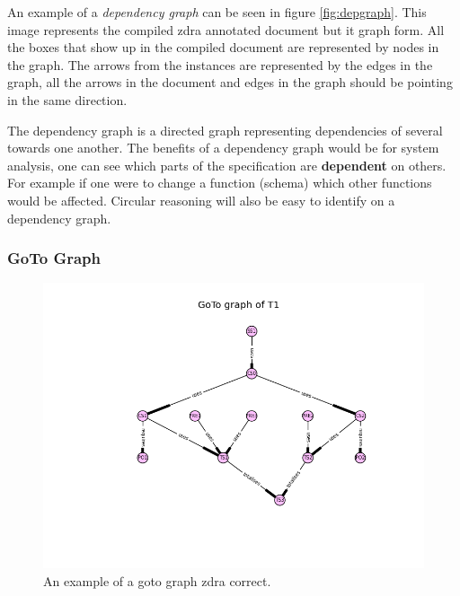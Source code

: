 An example of a \emph{dependency graph} can be seen in figure
\ref{fig:depgraph}. This image represents the compiled \gls{zdra} annotated
document but it graph form. All the boxes that show up in the compiled document
are represented by nodes in the graph. The arrows from the instances are
represented by the edges in the graph, all the arrows in the document and edges
in the graph should be pointing in the same direction.

The dependency graph is a directed graph representing dependencies
of several towards one another. The benefits of a dependency graph would be for system analysis, one can see
which parts of the specification are \textbf{dependent} on others. For example
if one were to change a function (schema) which other functions would be
affected. Circular reasoning will also be easy to identify on a dependency graph.


\subsubsection{GoTo Graph}

\begin{figure}[H]
\centering
\includegraphics[scale=0.6]{Figures/zdra/gotograph.png}
\caption{An example of a goto graph \gls{zdra} correct. \label{fig:gotograph}}
\end{figure}

